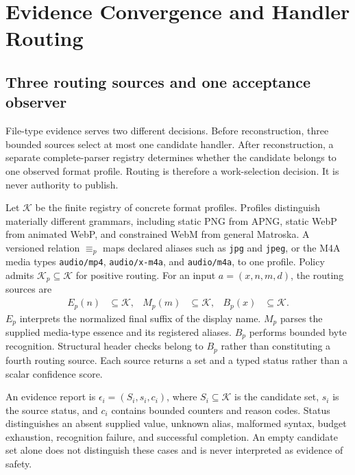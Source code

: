 \section{Evidence Convergence and Handler Routing}
\label{sec:evidence-convergence}

\subsection{Three routing sources and one acceptance observer}

File-type evidence serves two different decisions. Before reconstruction, three
bounded sources select at most one candidate handler. After reconstruction, a
separate complete-parser registry determines whether the candidate belongs to
one observed format profile. Routing is therefore a work-selection decision.
It is never authority to publish.

Let $\mathcal{K}$ be the finite registry of concrete format profiles. Profiles
distinguish materially different grammars, including static PNG from APNG,
static WebP from animated WebP, and constrained WebM from general Matroska. A
versioned relation $\equiv_p$ maps declared aliases such as \texttt{jpg} and
\texttt{jpeg}, or the M4A media types \texttt{audio/mp4},
\texttt{audio/x-m4a}, and \texttt{audio/m4a}, to one profile. Policy
admits $\mathcal{K}_p\subseteq\mathcal{K}$ for positive routing. For an input
$a=(x,n,m,d)$, the routing sources are
\begin{align}
  E_p(n)&\subseteq\mathcal{K}, &
  M_p(m)&\subseteq\mathcal{K}, &
  B_p(x)&\subseteq\mathcal{K}.
  \label{eq:evidence-functions}
\end{align}
$E_p$ interprets the normalized final suffix of the display name. $M_p$
parses the supplied media-type essence and its registered aliases. $B_p$
performs bounded byte recognition. Structural header checks belong to $B_p$
rather than constituting a fourth routing source. Each source returns a set and
a typed status rather than a scalar confidence score.

An evidence report is $\epsilon_i=(S_i,s_i,c_i)$, where
$S_i\subseteq\mathcal{K}$ is the candidate set, $s_i$ is the source status, and
$c_i$ contains bounded counters and reason codes. Status distinguishes an
absent supplied value, unknown alias, malformed syntax, budget exhaustion,
recognition failure, and successful completion. An empty candidate set alone
does not distinguish these cases and is never interpreted as evidence of
safety.


